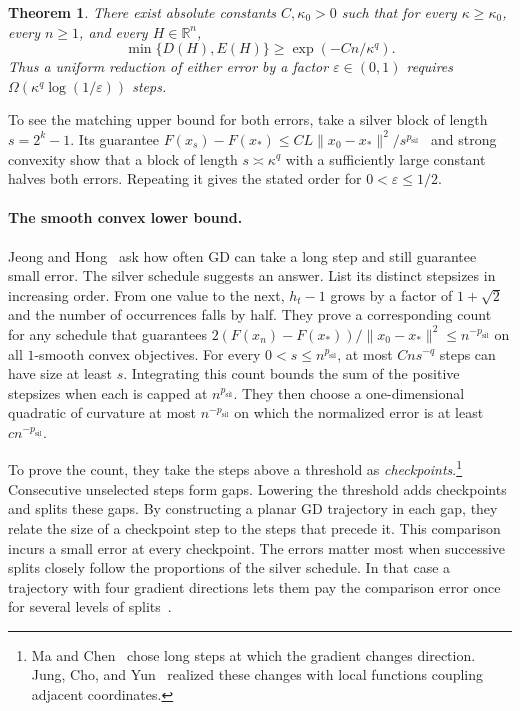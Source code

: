 \documentclass[11pt]{article}
\newtheorem{theorem}{Theorem}
\theoremstyle{definition}
\newcommand{\R}{\mathbb R}
\newcommand{\psil}{p_{\mathrm{sil}}}
\begin{document}
\begin{theorem}\label{thm:main}
There exist absolute constants $C,\kappa_0>0$ such that for every $\kappa\ge\kappa_0$, every $n\ge1$, and every $H\in\R^n$,
\[
 \min\{D(H),E(H)\}\ge \exp(-Cn/\kappa^q).
\]
Thus a uniform reduction of either error by a factor $\varepsilon\in(0,1)$ requires $\Omega(\kappa^q\log(1/\varepsilon))$ steps.
\end{theorem}

To see the matching upper bound for both errors, take a silver block of length $s=2^k-1$. Its guarantee $F(x_s)-F(x_*)\le CL\|x_0-x_*\|^2/s^{\psil}$~\cite[Theorem~1]{APconv} and strong convexity show that a block of length $s\asymp\kappa^q$ with a sufficiently large constant halves both errors. Repeating it gives the stated order for $0<\varepsilon\le1/2$.

\paragraph{The smooth convex lower bound.}
Jeong and Hong~\cite[Section~2]{JH} ask how often GD can take a long step and still guarantee small error. The silver schedule suggests an answer. List its distinct stepsizes in increasing order. From one value to the next, $h_t-1$ grows by a factor of $1+\sqrt2$ and the number of occurrences falls by half. They prove a corresponding count for any schedule that guarantees $2(F(x_n)-F(x_*))/\|x_0-x_*\|^2\le n^{-\psil}$ on all $1$-smooth convex objectives. For every $0<s\le n^{\psil}$, at most $Cn s^{-q}$ steps can have size at least $s$. Integrating this count bounds the sum of the positive stepsizes when each is capped at $n^{\psil}$. They then choose a one-dimensional quadratic of curvature at most $n^{-\psil}$ on which the normalized error is at least $c n^{-\psil}$.

To prove the count, they take the steps above a threshold as \emph{checkpoints}.\footnote{Ma and Chen~\cite[Theorem~4.1]{MC} chose long steps at which the gradient changes direction. Jung, Cho, and Yun~\cite[Section~2]{JCY} realized these changes with local functions coupling adjacent coordinates.} Consecutive unselected steps form gaps. Lowering the threshold adds checkpoints and splits these gaps. By constructing a planar GD trajectory in each gap, they relate the size of a checkpoint step to the steps that precede it. This comparison incurs a small error at every checkpoint. The errors matter most when successive splits closely follow the proportions of the silver schedule. In that case a trajectory with four gradient directions lets them pay the comparison error once for several levels of splits~\cite[Section~2.2 and Lemma~6.3]{JH}.
\end{document}

